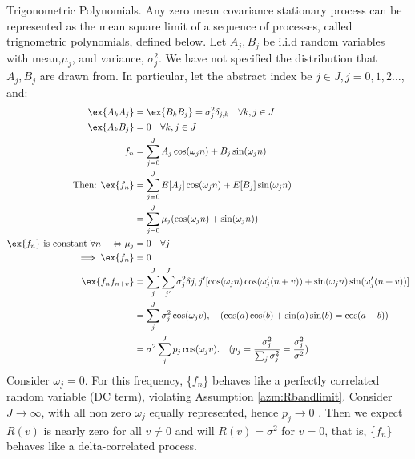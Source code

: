 \begin{defn} \label{sec:ap_ssp_tp} Trigonometric Polynomials.  Any zero mean covariance stationary process can be represented as the mean square limit of a sequence of processes, called trignometric polynomials, defined below. Let $A_j, B_j$ be i.i.d random variables with mean,$\mu_j$, and variance, $\sigma_j^2$. We have not specified the distribution that $A_j, B_j$ are drawn from. In particular, let the abstract index be $j \in J, j = 0,1,2... $, and:
\begin{align}
\ex{A_k A_j} &= \ex{B_k B_j} = \sigma_j^2 \delta_{j,k} \quad \forall k,j \in J\\
\ex{A_k B_j} &= 0 \quad  \forall k,j \in J \label{eqn:karlin_trig_cross} \\
f_n &= \sum_{j=0}^{J} A_j \cos(\omega_j n) + B_j \sin(\omega_j n) \label{eqn:E_f_trigpolynomial} \\
\text{Then: }\ex{f_n} &=  \sum_{j=0}^{J} E[A_j] \cos(\omega_j n) + E[B_j] \sin(\omega_j n) \\
& =  \sum_{j=0}^{J}  \mu_j(\cos(\omega_j n) + \sin(\omega_j n)) \\
\text{$\ex{f_n}$ is constant $\forall n$} \quad \Leftrightarrow \mu_j &=0  \quad \forall j\\
\implies \ex{f_n} &=  0 \\
\ex{f_n f_{n+v}} &= \sum_j^{J} \sum_{j'}^{J} \sigma_j^2\delta{j,j'} [\cos(\omega_j n)\cos(\omega_j' (n+v)) + \sin(\omega_j n)\sin(\omega_j' (n+v)) ]\\
&= \sum_j^{J} \sigma_j^2 \cos(\omega_jv), \quad \text{$(\cos(a)\cos(b) + \sin(a)\sin(b) = \cos(a-b))$} \\
&= \sigma^2 \sum_j^{J}  p_j \cos(\omega_jv). \quad \text{$(p_j = \frac{\sigma_j^2}{\sum_j \sigma_j^2} = \frac{\sigma_j^2}{\sigma^2})$}
\end{align}
Consider $\omega_j =0$. For this frequency, \{$f_n$\} behaves like a perfectly correlated random variable (DC term), violating Assumption \ref{azm:Rbandlimit}. Consider $J \to \infty$, with all non zero $\omega_j$ equally represented, hence $p_j \to 0$ . Then we expect $R(v)$ is nearly zero for all $v\neq 0$ and will $R(v)=\sigma^2$ for $v=0$, that is, \{$f_n$\} behaves like a delta-correlated process. 
\end{defn}

